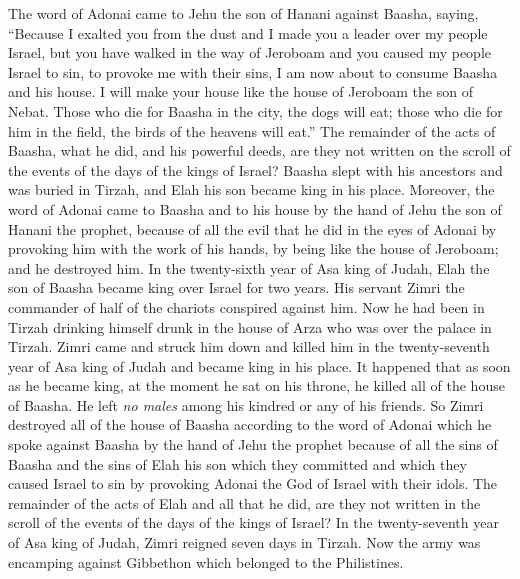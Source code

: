 \begin{biblechapter} %
\verse The word of Adonai came to Jehu the son of Hanani against Baasha, saying,
\verse “Because I exalted you from the dust and I made you a leader over my people Israel, but you have walked in the way of Jeroboam and you caused my people Israel to sin, to provoke me with their sins,
\verse I am now about to consume Baasha and his house. I will make your house like the house of Jeroboam the son of Nebat.
\verse Those who die for Baasha in the city, the dogs will eat; those who die for him in the field, the birds of the heavens will eat.”
\verse The remainder of the acts of Baasha, what he did, and his powerful deeds, are they not written on the scroll of the events of the days of the kings of Israel?
\verse Baasha slept with his ancestors and was buried in Tirzah, and Elah his son became king in his place.
\verse Moreover, the word of Adonai came to Baasha and to his house by the hand of Jehu the son of Hanani the prophet, because of all the evil that he did in the eyes of Adonai by provoking him with the work of his hands, by being like the house of Jeroboam; and he destroyed him.
 In the twenty-sixth year of Asa king of Judah, Elah the son of Baasha became king over Israel for two years.
\verse His servant Zimri the commander of half of the chariots conspired against him. Now he had been in Tirzah drinking himself drunk in the house of Arza who was over the palace in Tirzah.
\verse Zimri came and struck him down and killed him in the twenty-seventh year of Asa king of Judah and became king in his place.
\verse It happened that as soon as he became king, at the moment he sat on his throne, he killed all of the house of Baasha. He left \textit{no males} among his kindred or any of his friends.
\verse So Zimri destroyed all of the house of Baasha according to the word of Adonai which he spoke against Baasha by the hand of Jehu the prophet
\verse because of all the sins of Baasha and the sins of Elah his son which they committed and which they caused Israel to sin by provoking Adonai the God of Israel with their idols.
\verse The remainder of the acts of Elah and all that he did, are they not written in the scroll of the events of the days of the kings of Israel?
 In the twenty-seventh year of Asa king of Judah, Zimri reigned seven days in Tirzah. Now the army was encamping against Gibbethon which belonged to the Philistines.

\end{biblechapter}
